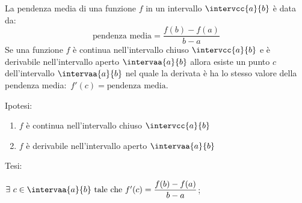 \begin{teorema}
La pendenza media di una funzione \(f\) in un intervallo 
\(\intervcc{a}{b}\) è data da:
\[\text{pendenza media} = \frac{f(b)-f(a)}{b-a}\]
Se una funzione \(f\) è continua nell'intervallo chiuso \(\intervcc{a}{b}\) e
è derivabile nell'intervallo aperto \(\intervaa{a}{b}\) allora
esiste un punto \(c\) dell'intervallo \(\intervaa{a}{b}\) nel quale 
la derivata è ha lo stesso valore della 
pendenza media:~\(f'(c)=\text{pendenza media}\).
\end{teorema}

\vspace*{-35mm}                           %
\begin{minipage}{.54\textwidth}
\noindent Ipotesi:
\begin{enumerate}[nosep]
 \item \(f\) è continua 
 nell'intervallo chiuso \(\intervcc{a}{b}\)
 \item \(f\) è derivabile 
 nell'intervallo aperto \(\intervaa{a}{b}\)
\end{enumerate}

\noindent Tesi: 

\(\exists~c \in \intervaa{a}{b}\text{ tale che } 
f'(c)=\dfrac{f(b)-f(a)}{b-a}\);
\end{minipage}
\hfill
\begin{minipage}{.42\textwidth}
\begin{center} \tlagrange \end{center}
\end{minipage}

\vspace{-15mm}                           %

